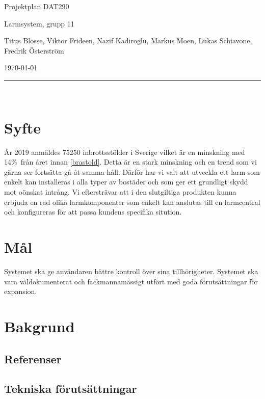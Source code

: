 \documentclass{article}
\begin{document}
\begin{center}
\thispagestyle{empty}
\parskip=14pt%
\vspace*{3\parskip}%

{\LARGE Projektplan DAT290}

{\large Larmsystem, grupp 11

Titus Blosse, Viktor Frideen, Nazif Kadiroglu, Markus Moen, Lukas Schiavone, Fredrik Österström

\today}


\rule{7cm}{0.4pt}\\
\end{center}
\newpage

\thispagestyle{empty}
\tableofcontents
\newpage


\section{Syfte}

År 2019 anmäldes 75250  inbrottsstölder i Sverige vilket är en minskning med 14\%\ från året innan \ref{brastold}. Detta är en stark minskning och en trend som vi gärna ser fortsätta gå åt samma håll. Därför har vi valt att utveckla ett larm som enkelt kan installeras i alla typer av bostäder och som ger ett grundligt skydd mot oönskat intrång. Vi eftersträvar att i den slutgiltiga produkten kunna erbjuda en rad olika larmkomponenter som enkelt kan anslutas till en larmcentral och konfigureras för att passa kundens specifika sitution. 


\section{Mål}

Systemet ska ge användaren bättre kontroll över sina tillhörigheter. Systemet ska vara väldokumenterat och fackmannamässigt utfört med goda förutsättningar för expansion.

\section{Bakgrund}

\subsection{Referenser}

\subsection{Tekniska förutsättningar}
\end{document}
